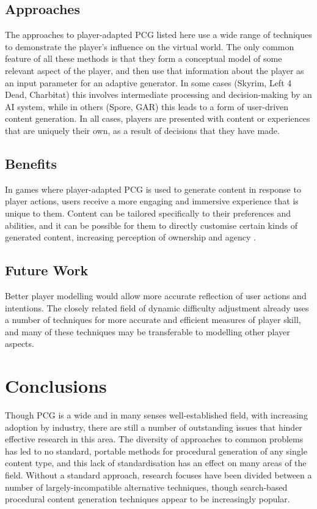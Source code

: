 \documentclass{acm_proc_article-sp}
\begin{document}
\subsection{Approaches}
The approaches to player-adapted PCG listed here use a wide range of techniques to demonstrate the player's influence on the virtual world. The only common feature of all these methods is that they form a conceptual model of some relevant aspect of the player, and then use that information about the player as an input parameter for an adaptive generator. In some cases (Skyrim, Left 4 Dead, Charbitat) this involves intermediate processing and decision-making by an AI system, while in others (Spore, GAR) this leads to a form of user-driven content generation. In all cases, players are presented with content or experiences that are uniquely their own, as a result of decisions that they have made.

\subsection{Benefits}
In games where player-adapted PCG is used to generate content in response to player actions, users receive a more engaging and immersive experience that is unique to them. Content can be tailored specifically to their preferences and abilities, and it can be possible for them to directly customise certain kinds of generated content, increasing perception of ownership and agency \cite{Hastings:2010:IGE:1814256.1814264}.

\subsection{Future Work}
Better player modelling would allow more accurate reflection of user actions and intentions. The closely related field of dynamic difficulty adjustment already uses a number of techniques for more accurate and efficient measures of player skill, and many of these techniques may be transferable to modelling other player aspects.

\section{Conclusions}
Though PCG is a wide and in many senses well-established field, with increasing adoption by industry, there are still a number of outstanding issues that hinder effective research in this area. The diversity of approaches to common problems has led to no standard, portable methods for procedural generation of any single content type, and this lack of standardisation has an effect on many areas of the field. Without a standard approach, research focuses have been divided between a number of largely-incompatible alternative techniques, though search-based procedural content generation techniques appear to be increasingly popular.
\end{document}
